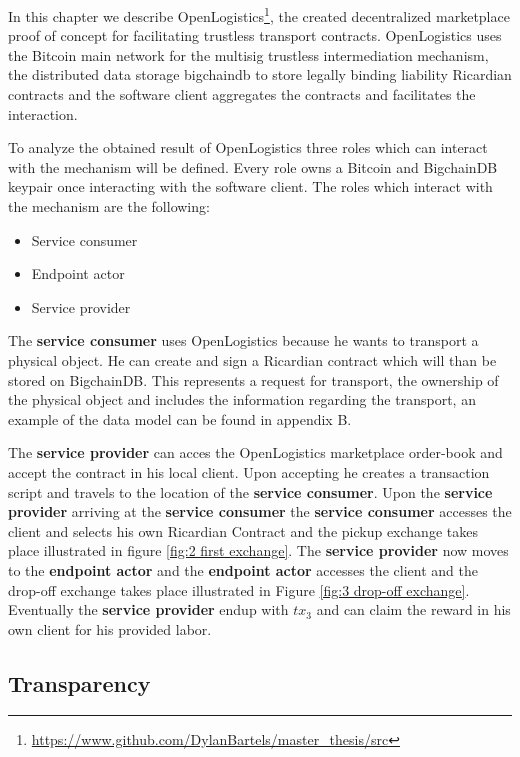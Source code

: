 In this chapter we describe OpenLogistics\footnote{\url{https://www.github.com/DylanBartels/master_thesis/src}}, the created decentralized marketplace proof of concept for facilitating trustless transport contracts. OpenLogistics uses the Bitcoin main network for the multisig trustless intermediation mechanism, the distributed data storage bigchaindb to store legally binding liability Ricardian contracts and the software client aggregates the contracts and facilitates the interaction. \par
To analyze the obtained result of OpenLogistics three roles which can interact with the mechanism will be defined. Every role owns a Bitcoin and BigchainDB keypair once interacting with the software client. The roles which interact with the mechanism are the following:
\begin{itemize}
  \item Service consumer
  \item Endpoint actor
  \item Service provider
\end{itemize}
The \textbf{service consumer} uses OpenLogistics because he wants to transport a physical object. He can create and sign a Ricardian contract which will than be stored on BigchainDB. This represents a request for transport, the ownership of the physical object and includes the information regarding the transport, an example of the data model can be found in appendix B. \par

The \textbf{service provider} can acces the OpenLogistics marketplace order-book and accept the contract in his local client. Upon accepting he creates a transaction script and travels to the location of the \textbf{service consumer}. Upon the \textbf{service provider} arriving at the \textbf{service consumer} the \textbf{service consumer} accesses the client and selects his own Ricardian Contract and the pickup exchange takes place illustrated in figure \ref{fig:2 first exchange}. The \textbf{service provider} now moves to the \textbf{endpoint actor} and the \textbf{endpoint actor} accesses the client and the drop-off exchange takes place illustrated in Figure \ref{fig:3 drop-off exchange}. Eventually the \textbf{service provider} endup with $tx_3$ and can claim the reward in his own client for his provided labor. \par

\subsection{Transparency}

